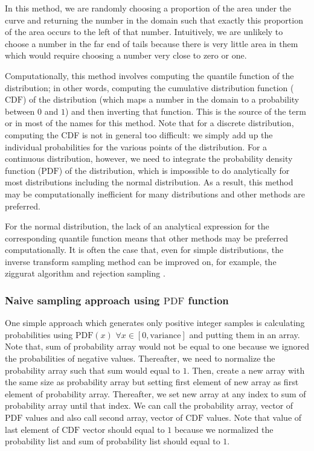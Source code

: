 In this method, we are randomly choosing a proportion of the area under the curve and returning the number in the domain such that exactly this proportion of the area occurs to the left of that number. Intuitively, we are unlikely to choose a number in the far end of tails because there is very little area in them which would require choosing a number very close to zero or one.

Computationally, this method involves computing the quantile function of the distribution; in other words, computing the cumulative distribution function ($\mathrm{CDF}$) of the distribution (which maps a number in the domain to a probability between $0$ and $1$) and then inverting that function. This is the source of the term  or  in most of the names for this method. Note that for a discrete distribution, computing the CDF is not in general too difficult: we simply add up the individual probabilities for the various points of the distribution. For a continuous distribution, however, we need to integrate the probability density function ($\mathrm{PDF}$) of the distribution, which is impossible to do analytically for most distributions including the normal distribution. As a result, this method may be computationally inefficient for many distributions and other methods are preferred.

For the normal distribution, the lack of an analytical expression for the corresponding quantile function means that other methods may be preferred computationally. It is often the case that, even for simple distributions, the inverse transform sampling method can be improved on, for example, the ziggurat algorithm and rejection sampling \cite{Janos2014}.

\subsubsection{Naive sampling approach using \texorpdfstring{$\mathrm{PDF}$}{PDF} function}
One simple approach which generates only positive integer samples is calculating probabilities using $\mathrm{PDF}(x)$ $\forall x \in [0, \text{variance}]$ and putting them in an array. Note that, sum of probability array would not be equal to one because we ignored the probabilities of negative values. Thereafter, we need to normalize the probability array such that sum would equal to $1$. Then, create a new array with the same size as probability array but setting first element of new array as first element of probability array. Thereafter, we set new array at any index to sum of probability array until that index. We can call the probability array, vector of $\mathrm{PDF}$ values and also call second array, vector of $\mathrm{CDF}$ values. Note that value of last element of $\mathrm{CDF}$ vector should equal to $1$ because we normalized the probability list and sum of probability list should equal to $1$. 

